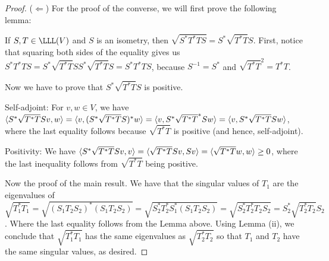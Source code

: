 \begin{proof}
 ($\Leftarrow$) For the proof of the converse, we will first prove the following lemma: 
 
 If $S, T\in\LLL(V)$ and $S$ is an isometry, then $\sqrt{S^\ast T^\ast TS}=S^\ast\sqrt{T^\ast T}S$. First, notice that squaring both sides of the equality gives us $S^\ast T^\ast TS =S^\ast \sqrt{T^\ast T}SS^\ast\sqrt{T^\ast T}S =S^\ast T^\ast TS$, because $S^{-1}=S^\ast$ and $\sqrt{T^\ast T}^2 =T^\ast T$.

 Now we have to prove that $S^\ast\sqrt{T^\ast T}S$ is positive.

 Self-adjoint: For $v,w\in V$, we have $\langle S^\ast\sqrt{T^\ast T}Sv, w\rangle =\langle v, (S^\ast\sqrt{T^\ast T}S)^\ast w\rangle =\langle v, S^\ast\sqrt{T^\ast T}^\ast Sw\rangle =\langle v, S^\ast\sqrt{T^\ast T}Sw\rangle$, where the last equality follows because $\sqrt{T^\ast T}$ is positive (and hence, self-adjoint).

 Positivity: We have $\langle S^\ast\sqrt{T^\ast T}Sv, v\rangle =\langle \sqrt{T^\ast T}Sv, Sv\rangle =\langle \sqrt{T^\ast T}w, w\rangle \geq 0$, where the last inequality follows from $\sqrt{T^\ast T}$ being positive.

 Now the proof of the main result. We have that the singular values of $T_1$ are the eigenvalues of $\sqrt{T_1^\ast T_1} =\sqrt{(S_1T_2S_2)^\ast (S_1T_2S_2)} =\sqrt{S_2^\ast T_2^\ast S_1^\ast (S_1T_2S_2)} =\sqrt{S_2^\ast T_2^\ast T_2S_2} =S_2^\ast\sqrt{T_2^\ast T_2}S_2$. Where the last equality follows from the Lemma above. Using Lemma (ii), we conclude that $\sqrt{T_1^\ast T_1}$ has the same eigenvalues as $\sqrt{T_2^\ast T_2}$ so that $T_1$ and $T_2$ have the same singular values, as desired.
\end{proof}

